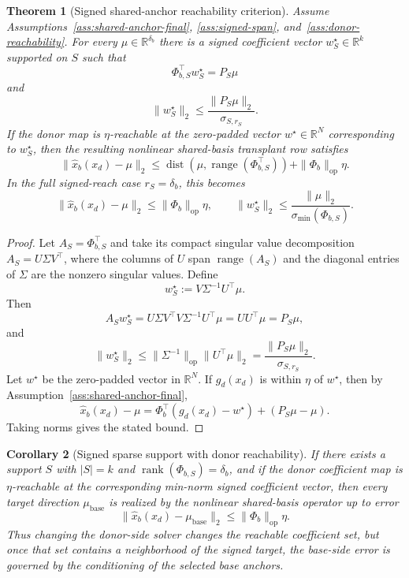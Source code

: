 \documentclass{article}
\theoremstyle{plain}
\newtheorem{theorem}{Theorem}[section]
\newtheorem{corollary}[theorem]{Corollary}
\theoremstyle{definition}
\theoremstyle{remark}
\begin{document}
\begin{theorem}[Signed shared-anchor reachability criterion]
\label{thm:signed-anchor-representation}
Assume Assumptions~\ref{ass:shared-anchor-final}, \ref{ass:signed-span}, and~\ref{ass:donor-reachability}. For every $\mu\in\mathbb{R}^{\delta_b}$ there is a signed coefficient vector $w_S^\star\in\mathbb{R}^{k}$ supported on $S$ such that
\[
\Phi_{b,S}^\top w_S^\star=P_S\mu
\]
and
\[
\|w_S^\star\|_2
\le
\frac{\|P_S\mu\|_2}{\sigma_{S,r_S}}.
\]
If the donor map is $\eta$-reachable at the zero-padded vector $w^\star\in\mathbb{R}^N$ corresponding to $w_S^\star$, then the resulting nonlinear shared-basis transplant row satisfies
\[
\|\widehat{x}_b(x_d)-\mu\|_2
\le
\operatorname{dist}(\mu,\operatorname{range}(\Phi_{b,S}^\top))
+
\|\Phi_b\|_{\mathrm{op}}\eta.
\]
In the full signed-reach case $r_S=\delta_b$, this becomes
\[
\|\widehat{x}_b(x_d)-\mu\|_2
\le
\|\Phi_b\|_{\mathrm{op}}\eta,
\qquad
\|w_S^\star\|_2
\le
\frac{\|\mu\|_2}{\sigma_{\min}(\Phi_{b,S})}.
\]
\end{theorem}

\begin{proof}
Let $A_S=\Phi_{b,S}^\top$ and take its compact singular value decomposition $A_S=U\Sigma V^\top$, where the columns of $U$ span $\operatorname{range}(A_S)$ and the diagonal entries of $\Sigma$ are the nonzero singular values. Define
\[
w_S^\star:=V\Sigma^{-1}U^\top\mu.
\]
Then
\[
A_Sw_S^\star=U\Sigma V^\top V\Sigma^{-1}U^\top\mu=UU^\top\mu=P_S\mu,
\]
and
\[
\|w_S^\star\|_2
\le
\|\Sigma^{-1}\|_{\mathrm{op}}\|U^\top\mu\|_2
=
\frac{\|P_S\mu\|_2}{\sigma_{S,r_S}}.
\]
Let $w^\star$ be the zero-padded vector in $\mathbb{R}^N$. If $g_d(x_d)$ is within $\eta$ of $w^\star$, then by Assumption~\ref{ass:shared-anchor-final},
\[
\widehat{x}_b(x_d)-\mu
=
\Phi_b^\top(g_d(x_d)-w^\star)+(P_S\mu-\mu).
\]
Taking norms gives the stated bound.
\end{proof}

\begin{corollary}[Signed sparse support with donor reachability]
\label{cor:signed-support}
If there exists a support $S$ with $|S|=k$ and $\operatorname{rank}(\Phi_{b,S})=\delta_b$, and if the donor coefficient map is $\eta$-reachable at the corresponding min-norm signed coefficient vector, then every target direction $\mu_{\mathrm{base}}$ is realized by the nonlinear shared-basis operator up to error
\[
\|\widehat{x}_b(x_d)-\mu_{\mathrm{base}}\|_2
\le
\|\Phi_b\|_{\mathrm{op}}\eta.
\]
Thus changing the donor-side solver changes the reachable coefficient set, but once that set contains a neighborhood of the signed target, the base-side error is governed by the conditioning of the selected base anchors.
\end{corollary}
\end{document}

